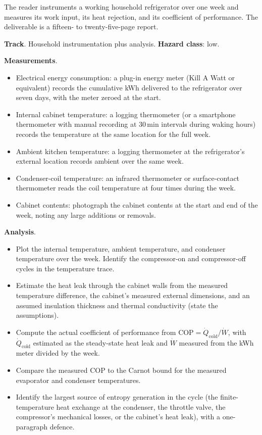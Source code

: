 \begin{project}
The reader instruments a working household refrigerator over one week
and measures its work input, its heat rejection, and its coefficient
of performance. The deliverable is a fifteen- to twenty-five-page
report.

\textbf{Track}. Household instrumentation plus analysis.
\textbf{Hazard class}: low.

\textbf{Measurements}.

\begin{itemize}[leftmargin=*]
  \item Electrical energy consumption: a plug-in energy meter (Kill A
    Watt or equivalent) records the cumulative kWh delivered to the
    refrigerator over seven days, with the meter zeroed at the start.
  \item Internal cabinet temperature: a logging thermometer (or a
    smartphone thermometer with manual recording at $30\,\text{min}$
    intervals during waking hours) records the temperature at the
    same location for the full week.
  \item Ambient kitchen temperature: a logging thermometer at the
    refrigerator's external location records ambient over the same
    week.
  \item Condenser-coil temperature: an infrared thermometer or
    surface-contact thermometer reads the coil temperature at four
    times during the week.
  \item Cabinet contents: photograph the cabinet contents at the
    start and end of the week, noting any large additions or
    removals.
\end{itemize}

\textbf{Analysis}.

\begin{itemize}[leftmargin=*]
  \item Plot the internal temperature, ambient temperature, and
    condenser temperature over the week. Identify the
    compressor-on and compressor-off cycles in the temperature trace.
  \item Estimate the heat leak through the cabinet walls from the
    measured temperature difference, the cabinet's measured external
    dimensions, and an assumed insulation thickness and thermal
    conductivity (state the assumptions).
  \item Compute the actual coefficient of performance from $\text{COP}
    = \dot{Q}_{\text{cold}}/\dot{W}$, with $\dot{Q}_{\text{cold}}$
    estimated as the steady-state heat leak and $\dot{W}$ measured
    from the kWh meter divided by the week.
  \item Compare the measured COP to the Carnot bound for the measured
    evaporator and condenser temperatures.
  \item Identify the largest source of entropy generation in the
    cycle (the finite-temperature heat exchange at the condenser, the
    throttle valve, the compressor's mechanical losses, or the
    cabinet's heat leak), with a one-paragraph defence.
\end{itemize}


\end{project}

